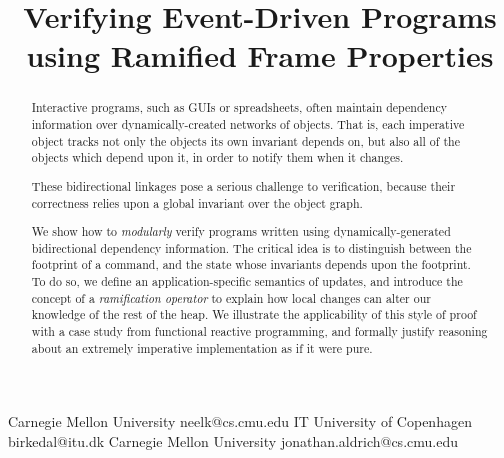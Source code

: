 \documentclass[preprint,natbib]{sigplanconf}
\begin{document}
\copyrightdata{[to be supplied]} 


\title{Verifying Event-Driven Programs using Ramified Frame Properties}

           {Carnegie Mellon University}
           {neelk@cs.cmu.edu}
           {IT University of Copenhagen}
           {birkedal@itu.dk}
           {Carnegie Mellon University}
           {jonathan.aldrich@cs.cmu.edu}
\maketitle

\begin{abstract}
Interactive programs, such as GUIs or spreadsheets, often maintain
dependency information over dynamically-created networks of objects.
That is, each imperative object tracks not only the objects its own
invariant depends on, but also all of the objects which depend upon
it, in order to notify them when it changes.

These bidirectional linkages pose a serious challenge to verification,
because their correctness relies upon a global invariant over the
object graph. %

We show how to \emph{modularly} verify programs written
using dynamically-generated bidirectional dependency information. The
critical idea is to distinguish between the footprint of a command,
and the state whose invariants depends upon the footprint. To do so,
we define an application-specific semantics of updates, and introduce
the concept of a \emph{ramification operator} to explain how local
changes can alter our knowledge of the rest of the heap.
We illustrate the applicability of this style of proof with a case
study from functional reactive programming, and formally justify
reasoning about an extremely imperative implementation as if it were
pure.
\end{abstract}
\end{document}
